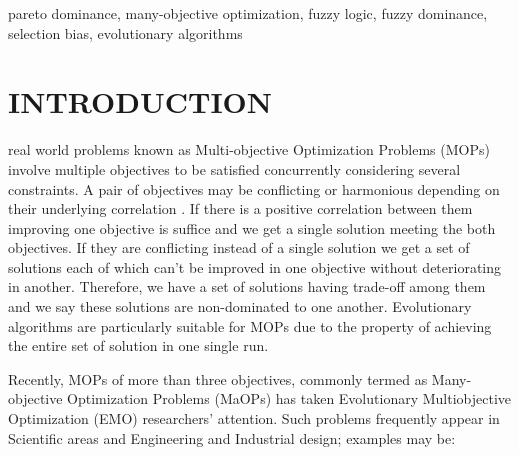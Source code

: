 \documentclass[journal]{IEEEtran}
\begin{document}
\begin{IEEEkeywords}
pareto dominance, many-objective optimization, fuzzy logic, fuzzy dominance, selection bias, evolutionary algorithms
\end{IEEEkeywords}

%
\IEEEpeerreviewmaketitle



\section{INTRODUCTION}
\label{sec:introduction}
 real world problems known as Multi-objective Optimization Problems (MOPs) involve multiple objectives to be satisfied concurrently considering several constraints. A pair of objectives may be conflicting or harmonious depending on their underlying correlation \cite{purshouse2003conflict}. If there is a positive correlation between them improving one objective is suffice and we get a single solution meeting the both objectives. If they are conflicting instead of a single solution we get a set of solutions each of which can't be improved in one objective without deteriorating in another. Therefore, we have a set of solutions having trade-off among them  and we say these solutions are non-dominated to one another. Evolutionary algorithms are particularly suitable for MOPs due to the property of achieving the entire set of solution in one single run.

Recently, MOPs of more than three objectives, commonly termed as Many-objective Optimization Problems (MaOPs) \cite{farina2002optimal}\cite{yang2013grid} has taken Evolutionary Multiobjective Optimization (EMO) researchers' attention. Such problems frequently appear in Scientific areas and Engineering and Industrial design; examples may be:
\end{document}
